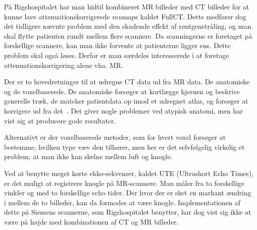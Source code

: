 På Rigshospitalet har man hidtil kombineret MR billeder med CT billeder
for at kunne lave attenuationskorrigerede $mu$maps kaldet FullCT.
Dette medfører dog det tidligere nævnte problem med den skadende
effekt af røntgenstråling, og man skal flytte patienten rundt mellem
flere scannere. Da scanningerne er foretaget på forskellige scannere,
kan man ikke forvente at patienterne ligger ens. Dette problem skal
også løses. Derfor er man særdeles interesserede i at foretage
attenuationskorrigering alene vha. MR.

Der er to hovedretninger til at udregne CT data ud fra MR data. De
anatomiske og de voxelbaserede. De anatomiske forsøger at kortlægge
hjernen og beskrive generelle træk, de matcher patientdata op imod
et udregnet atlas, og forsøger at korrigere ud fra det~\cite{atlas1,
atlas2}. Det giver nogle problemer ved atypisk anatomi, men har vist sig
at producere gode resultater.

Alternativt er der voxelbaserede metoder, som for hvert voxel forsøger
at bestemme, hvilken type væv den tilhører, men her er det selvfølgelig
virkelig et problem, at man ikke kan skelne mellem luft og knogle.

Ved at benytte meget korte ekko-sekvenser, kaldet UTE (Ultrashort Echo
Times), er det muligt at registrere knogle på MR-scannere. Man måler fra
to forskellige vinkler og med to forskellige echo tider. Der hvor der er
sket en markant ændring i mellem de to billeder, kan da formodes at være
knogle. Implementationen af dette på Siemens scannerne, som Rigshospitalet
benytter, har dog vist sig ikke at være på højde med kombinationen af
CT og MR billeder.

